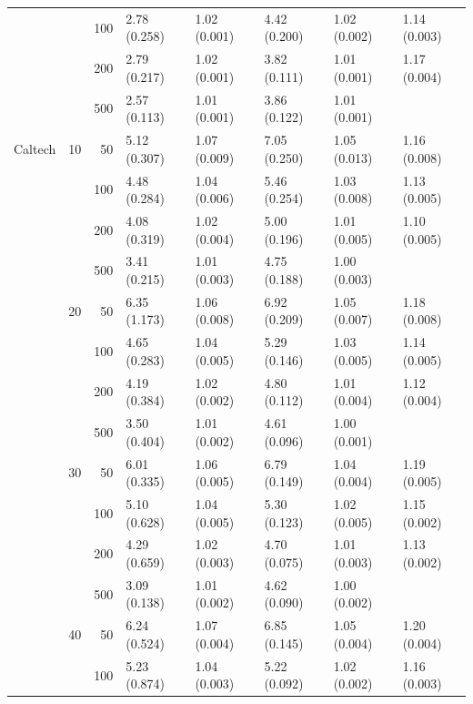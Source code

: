 \begin{longtable}{p{}lrlllll}
      &     & 100 &   2.78 (0.258) &   1.02 (0.001) &   4.42 (0.200) &         1.02 (0.002) &  1.14 (0.003) \\
      &     & 200 &   2.79 (0.217) &   1.02 (0.001) &   3.82 (0.111) &         1.01 (0.001) &  1.17 (0.004) \\
      &     & 500 &   2.57 (0.113) &   1.01 (0.001) &   3.86 (0.122) &         1.01 (0.001) &            \\
\midrule
Caltech & 10  & 50  &   5.12 (0.307) &   1.07 (0.009) &   7.05 (0.250) &         1.05 (0.013) &  1.16 (0.008) \\
      &     & 100 &   4.48 (0.284) &   1.04 (0.006) &   5.46 (0.254) &         1.03 (0.008) &  1.13 (0.005) \\
      &     & 200 &   4.08 (0.319) &   1.02 (0.004) &   5.00 (0.196) &         1.01 (0.005) &  1.10 (0.005) \\
      &     & 500 &   3.41 (0.215) &   1.01 (0.003) &   4.75 (0.188) &         1.00 (0.003) &            \\
      & 20  & 50  &   6.35 (1.173) &   1.06 (0.008) &   6.92 (0.209) &         1.05 (0.007) &  1.18 (0.008) \\
      &     & 100 &   4.65 (0.283) &   1.04 (0.005) &   5.29 (0.146) &         1.03 (0.005) &  1.14 (0.005) \\
      &     & 200 &   4.19 (0.384) &   1.02 (0.002) &   4.80 (0.112) &         1.01 (0.004) &  1.12 (0.004) \\
      &     & 500 &   3.50 (0.404) &   1.01 (0.002) &   4.61 (0.096) &         1.00 (0.001) &            \\
      & 30  & 50  &   6.01 (0.335) &   1.06 (0.005) &   6.79 (0.149) &         1.04 (0.004) &  1.19 (0.005) \\
      &     & 100 &   5.10 (0.628) &   1.04 (0.005) &   5.30 (0.123) &         1.02 (0.005) &  1.15 (0.002) \\
      &     & 200 &   4.29 (0.659) &   1.02 (0.003) &   4.70 (0.075) &         1.01 (0.003) &  1.13 (0.002) \\
      &     & 500 &   3.09 (0.138) &   1.01 (0.002) &   4.62 (0.090) &         1.00 (0.002) &            \\
      & 40  & 50  &   6.24 (0.524) &   1.07 (0.004) &   6.85 (0.145) &         1.05 (0.004) &  1.20 (0.004) \\
      &     & 100 &   5.23 (0.874) &   1.04 (0.003) &   5.22 (0.092) &         1.02 (0.002) &  1.16 (0.003) \\

\end{longtable}

